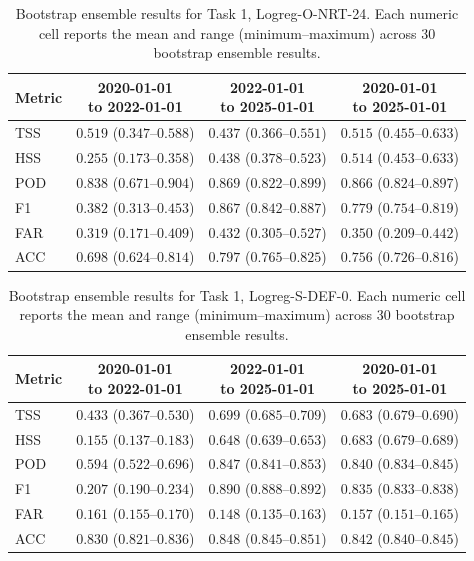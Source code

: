 \begin{table}[htbp]
\centering
\small
\caption{Bootstrap ensemble results for Task 1, Logreg-O-NRT-24. Each numeric cell reports the mean and range (minimum--maximum) across 30 bootstrap ensemble results.}
\label{tab:app-task1-logreg-o-nrt-24}
\begin{tabular}{lccc}
\toprule
Metric & \shortstack{2020-01-01\\to 2022-01-01} & \shortstack{2022-01-01\\to 2025-01-01} & \shortstack{2020-01-01\\to 2025-01-01} \\
\midrule
TSS & $0.519$ ($0.347$--$0.588$) & $0.437$ ($0.366$--$0.551$) & $0.515$ ($0.455$--$0.633$) \\
HSS & $0.255$ ($0.173$--$0.358$) & $0.438$ ($0.378$--$0.523$) & $0.514$ ($0.453$--$0.633$) \\
POD & $0.838$ ($0.671$--$0.904$) & $0.869$ ($0.822$--$0.899$) & $0.866$ ($0.824$--$0.897$) \\
F1 & $0.382$ ($0.313$--$0.453$) & $0.867$ ($0.842$--$0.887$) & $0.779$ ($0.754$--$0.819$) \\
FAR & $0.319$ ($0.171$--$0.409$) & $0.432$ ($0.305$--$0.527$) & $0.350$ ($0.209$--$0.442$) \\
ACC & $0.698$ ($0.624$--$0.814$) & $0.797$ ($0.765$--$0.825$) & $0.756$ ($0.726$--$0.816$) \\
\bottomrule
\end{tabular}
\end{table}
\clearpage

\begin{table}[htbp]
\centering
\small
\caption{Bootstrap ensemble results for Task 1, Logreg-S-DEF-0. Each numeric cell reports the mean and range (minimum--maximum) across 30 bootstrap ensemble results.}
\label{tab:app-task1-logreg-s-def-0}
\begin{tabular}{lccc}
\toprule
Metric & \shortstack{2020-01-01\\to 2022-01-01} & \shortstack{2022-01-01\\to 2025-01-01} & \shortstack{2020-01-01\\to 2025-01-01} \\
\midrule
TSS & $0.433$ ($0.367$--$0.530$) & $0.699$ ($0.685$--$0.709$) & $0.683$ ($0.679$--$0.690$) \\
HSS & $0.155$ ($0.137$--$0.183$) & $0.648$ ($0.639$--$0.653$) & $0.683$ ($0.679$--$0.689$) \\
POD & $0.594$ ($0.522$--$0.696$) & $0.847$ ($0.841$--$0.853$) & $0.840$ ($0.834$--$0.845$) \\
F1 & $0.207$ ($0.190$--$0.234$) & $0.890$ ($0.888$--$0.892$) & $0.835$ ($0.833$--$0.838$) \\
FAR & $0.161$ ($0.155$--$0.170$) & $0.148$ ($0.135$--$0.163$) & $0.157$ ($0.151$--$0.165$) \\
ACC & $0.830$ ($0.821$--$0.836$) & $0.848$ ($0.845$--$0.851$) & $0.842$ ($0.840$--$0.845$) \\
\bottomrule
\end{tabular}
\end{table}
\clearpage

